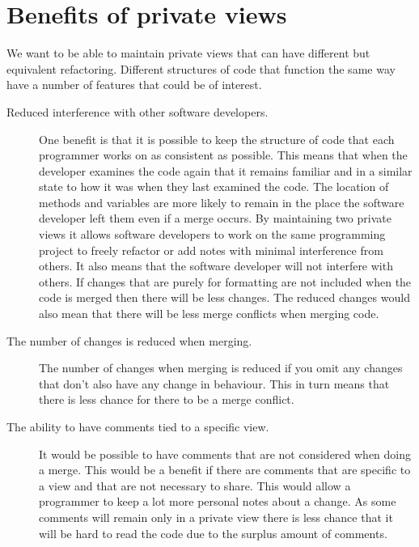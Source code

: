 \section{Benefits of private views}
We want to be able to maintain private views that can have different but equivalent refactoring. Different structures of code that function the same way have a number of features that could be of interest.

\begin{description}

\item [Reduced interference with other software developers.]   
One benefit is that it is possible to keep the structure of code that each programmer works on as consistent as possible. 
This means that when the developer examines the code again that it remains familiar and in a similar state to how it was when they last examined the code.
The location of methods and variables are more likely to remain in the place the software developer left them even if a merge occurs.
By maintaining two private views it allows software developers to work on the same programming project to freely refactor or add notes with minimal interference from others.
It also means that the software developer will not interfere with others.
If changes that are purely for formatting are not included when the code is merged then there will be less changes.
The reduced changes would also mean that there will be less merge conflicts when merging code.
  
\item [The number of changes is reduced when merging.] 
The number of changes when merging is reduced if you omit any changes that don't also have any change in behaviour.  This in turn means that there is less chance for there to be a merge conflict.
  
\item [The ability to have comments tied to a specific view.] 
It would be possible to have comments that are not considered when doing a merge. 
This would be a benefit if there are comments that are specific to a view and that are not necessary to share.  
This would allow a programmer to keep a lot more personal notes about a change.  
As some comments will remain only in a private view there is less chance that it will be hard to read the code due to the surplus amount of comments. 

\end{description}

